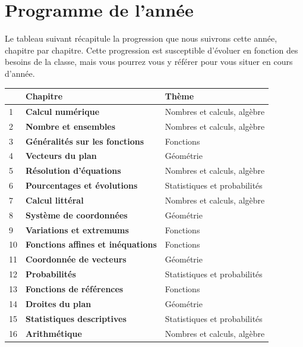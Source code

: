 \documentclass[oneside,12pt]{article}          %
\begin{document}
\section{Programme de l'année}

Le tableau suivant récapitule la progression que nous suivrons cette année, chapitre par chapitre. Cette progression est susceptible d'évoluer en fonction des besoins de la classe, mais vous pourrez vous y référer pour vous situer en cours d'année.

\begin{center}
	\renewcommand{\arraystretch}{1.5}
	\begin{tabular}{| P{2cm} | P{8cm} | P{8cm} |} \hline
		\no & Chapitre & Thème \\ \hline \hline
		 1 & \textbf{Calcul numérique} & Nombres et calculs, algèbre \\ \hline
		2 & \textbf{Nombre et ensembles} & Nombres et calculs, algèbre \\ \hline
		 3 & \textbf{Généralités sur les fonctions} & Fonctions \\ \hline
		 4 & \textbf{Vecteurs du plan} & Géométrie	\\ \hline
		 5 & \textbf{Résolution d'équations} & Nombres et calculs, algèbre	\\ \hline
		 6 & \textbf{Pourcentages et évolutions} & Statistiques et probabilités	\\ \hline
		 7 & \textbf{Calcul littéral} & Nombres et calculs, algèbre	\\ \hline
		 8 & \textbf{Système de coordonnées} & Géométrie 	\\ \hline
		 9 & \textbf{Variations et extremums} & Fonctions	\\ \hline
		 10 & \textbf{Fonctions affines et inéquations} & Fonctions	\\ \hline
		11 & \textbf{Coordonnée de vecteurs} & Géométrie	\\ \hline
		 12 & \textbf{Probabilités} & Statistiques et probabilités	\\ \hline
		 13 & \textbf{Fonctions de références} & Fonctions	\\ \hline
		 14 & \textbf{Droites du plan} & Géométrie	\\ \hline
		 15 & \textbf{Statistiques descriptives} & Statistiques et probabilités	\\ \hline
		 16 & \textbf{Arithmétique} & Nombres et calculs, algèbre	\\ \hline
	\end{tabular}
\end{center}
\end{document}

